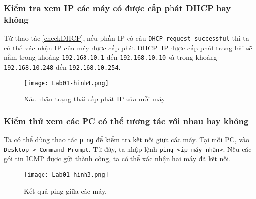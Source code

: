 \documentclass[]{article}
\begin{document}
\subsubsection{Kiểm tra xem IP các máy có được cấp phát DHCP hay không}
Từ thao tác \ref{checkDHCP}, nếu phần IP có câu \texttt{DHCP request successful} thì ta có thể xác nhận IP của máy được cấp phát DHCP. IP được cấp phát trong bài sẽ nằm trong khoảng \texttt{192.168.10.1} đến \texttt{192.168.10.10} và trong khoảng \texttt{192.168.10.248} đến \texttt{192.168.10.254}.
\begin{figure}[H]
    \centering
    \texttt{[image: Lab01-hinh4.png]}
    \caption{Xác nhận trạng thái cấp phát IP của mỗi máy}
\end{figure}
\subsubsection{Kiểm thử xem các PC có thể tương tác với nhau hay không}
Ta có thể dùng thao tác \texttt{ping} để kiểm tra kết nối giữa các máy. Tại mỗi PC, vào \texttt{Desktop > Command Prompt}. Từ đây, ta nhập lệnh \texttt{ping <ip máy nhận>}. Nếu các gói tin ICMP được gửi thành công, ta có thể xác nhận hai máy đã kết nối.
\begin{figure}[H]
    \centering
    \texttt{[image: Lab01-hinh3.png]}
    \caption{Kết quả ping giữa các máy.}
\end{figure}
\end{document}
